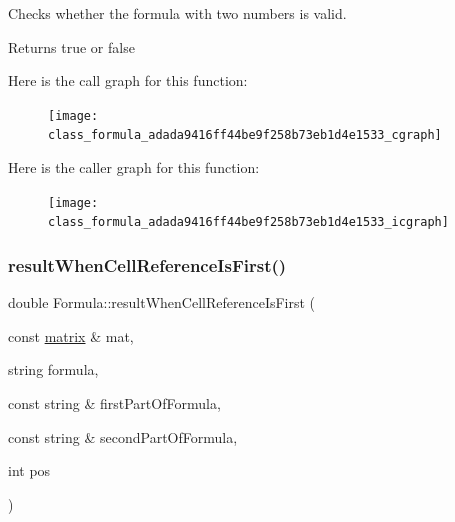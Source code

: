 Checks whether the formula with two numbers is valid. \begin{DoxyReturn}{Returns}
true or false 
\end{DoxyReturn}
Here is the call graph for this function\+:\nopagebreak
\begin{figure}[H]
\begin{center}
\leavevmode
\texttt{[image: class\_formula\_adada9416ff44be9f258b73eb1d4e1533\_cgraph]}
\end{center}
\end{figure}
Here is the caller graph for this function\+:\nopagebreak
\begin{figure}[H]
\begin{center}
\leavevmode
\texttt{[image: class\_formula\_adada9416ff44be9f258b73eb1d4e1533\_icgraph]}
\end{center}
\end{figure}
\mbox{\label{class_formula_a9a27ccdd3ee3143b1f6e541ec3c6a0ec}} 
\subsubsection{\texorpdfstring{result\+When\+Cell\+Reference\+Is\+First()}{resultWhenCellReferenceIsFirst()}}
{\footnotesize\ttfamily double Formula\+::result\+When\+Cell\+Reference\+Is\+First (\begin{DoxyParamCaption}\item[{const \hyperlink{formula_8h_a869e2a5deeb3daa4c82d6bc91cf20d92}{matrix} \&}]{mat,  }\item[{string}]{formula,  }\item[{const string \&}]{first\+Part\+Of\+Formula,  }\item[{const string \&}]{second\+Part\+Of\+Formula,  }\item[{int}]{pos }\end{DoxyParamCaption})\hspace{0.3cm}{\ttfamily [private]}}

